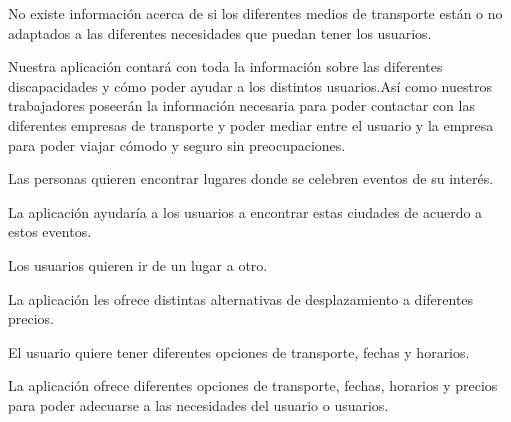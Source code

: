 \vspace{0.5cm}

\begin{problema}

    No existe información acerca de si los diferentes medios de transporte están o no adaptados a las diferentes necesidades que puedan tener los usuarios. 

    {\centering
    \begin{vision}\justifying \noindent
        Nuestra aplicación contará con toda la información sobre las diferentes discapacidades y cómo poder ayudar a los distintos usuarios.Así como nuestros trabajadores poseerán la información necesaria para poder contactar con las diferentes empresas de transporte y poder mediar entre el usuario y la empresa para poder viajar cómodo y seguro sin preocupaciones.

    \end{vision}}
\end{problema}

\vspace{0.5cm}

\begin{problema}

    Las personas quieren encontrar lugares donde se celebren eventos de su interés.

    {\centering
    \begin{vision}\justifying \noindent
        La aplicación ayudaría a los usuarios a encontrar estas ciudades de acuerdo a estos eventos.
    \end{vision}}
\end{problema}

\vspace{0.5cm}

\begin{problema}

    Los usuarios quieren ir de un lugar a otro.

    {\centering
    \begin{vision}\justifying \noindent
        La aplicación les ofrece distintas alternativas de desplazamiento a diferentes precios.
    \end{vision}}
\end{problema}

\vspace{0.5cm}

\begin{problema}

    El usuario quiere tener diferentes opciones de transporte, fechas y horarios.

    {\centering
    \begin{vision}\justifying \noindent
        La aplicación ofrece diferentes opciones de transporte, fechas, horarios y precios para poder adecuarse a las necesidades del usuario o usuarios.
    \end{vision}}
\end{problema}

